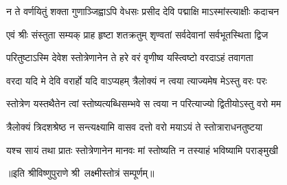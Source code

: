 \twolineshloka
{न ते वर्णयितुं शक्ता गुणाञ्जिह्वाऽपि वेधसः}
{प्रसीद देवि पद्माक्षि माऽस्मांस्त्याक्षीः कदाचन}

\twolineshloka
{एवं श्रीः संस्तुता सम्यक् प्राह हृष्टा शतक्रतुम्}
{शृण्वतां सर्वदेवानां सर्वभूतस्थिता द्विज}

\twolineshloka
{परितुष्टाऽस्मि देवेश स्तोत्रेणानेन ते हरे}
{वरं वृणीष्व यस्त्विष्टो वरदाऽहं तवागता}

\twolineshloka
{वरदा यदि मे देवि वरार्हो यदि वाऽप्यहम्}
{त्रैलोक्यं न त्वया त्याज्यमेष मेऽस्तु वरः परः}

\twolineshloka
{स्तोत्रेण यस्तथैतेन त्वां स्तोष्यत्यब्धिसम्भवे}
{स त्वया न परित्याज्यो द्वितीयोऽस्तु वरो मम}

\twolineshloka
{त्रैलोक्यं त्रिदशश्रेष्ठ न सन्त्यक्ष्यामि वासव}
{दत्तो वरो मयाऽयं ते स्तोत्राराधनतुष्टया}

\twolineshloka
{यश्च सायं तथा प्रातः स्तोत्रेणानेन मानवः}
{मां स्तोष्यति न तस्याहं भविष्यामि पराङ्मुखी}

॥इति श्रीविष्णुपुराणे श्री~लक्ष्मीस्तोत्रं सम्पूर्णम्॥
